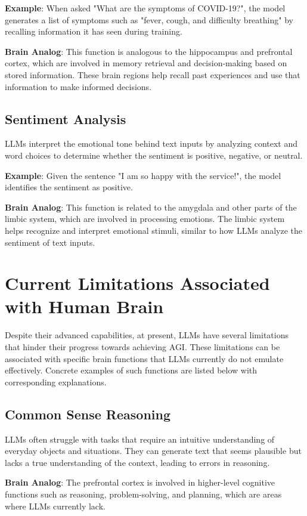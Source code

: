 \documentclass[a4paper,10.5pt]{article}
\begin{document}
\textbf{Example}: When asked "What are the symptoms of COVID-19?", the model generates a list of symptoms such as "fever, cough, and difficulty breathing" by recalling information it has seen during training.

\textbf{Brain Analog}: This function is analogous to the hippocampus and prefrontal cortex, which are involved in memory retrieval and decision-making based on stored information. These brain regions help recall past experiences and use that information to make informed decisions.

\subsection{Sentiment Analysis}
LLMs interpret the emotional tone behind text inputs by analyzing context and word choices to determine whether the sentiment is positive, negative, or neutral.

\textbf{Example}: Given the sentence "I am so happy with the service!", the model identifies the sentiment as positive.

\textbf{Brain Analog}: This function is related to the amygdala and other parts of the limbic system, which are involved in processing emotions. The limbic system helps recognize and interpret emotional stimuli, similar to how LLMs analyze the sentiment of text inputs.

\section{Current Limitations Associated with Human Brain}

Despite their advanced capabilities, at present, LLMs have several limitations that hinder their progress towards achieving AGI. These limitations can be associated with specific brain functions that LLMs currently do not emulate effectively. Concrete examples of such functions are listed below with corresponding explanations.

\subsection{Common Sense Reasoning}
LLMs often struggle with tasks that require an intuitive understanding of everyday objects and situations. They can generate text that seems plausible but lacks a true understanding of the context, leading to errors in reasoning.

\textbf{Brain Analog}: The prefrontal cortex is involved in higher-level cognitive functions such as reasoning, problem-solving, and planning, which are areas where LLMs currently lack.
\end{document}
